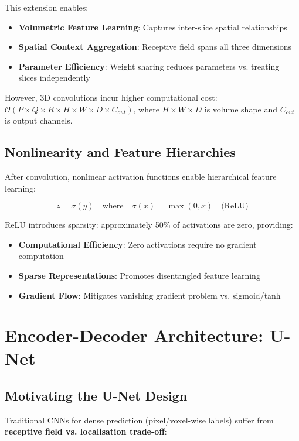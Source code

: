 \documentclass{ecsproject}     %
\begin{document}
This extension enables:
\begin{itemize}
    \item \textbf{Volumetric Feature Learning}: Captures inter-slice spatial relationships
    \item \textbf{Spatial Context Aggregation}: Receptive field spans all three dimensions
    \item \textbf{Parameter Efficiency}: Weight sharing reduces parameters vs. treating slices independently
\end{itemize}

However, 3D convolutions incur higher computational cost: $\mathcal{O}(P \times Q \times R \times H \times W \times D \times C_{out})$, where $H \times W \times D$ is volume shape and $C_{out}$ is output channels.

\subsection{Nonlinearity and Feature Hierarchies}

After convolution, nonlinear activation functions enable hierarchical feature learning:

\begin{equation}
z = \sigma(y) \quad \text{where} \quad \sigma(x) = \max(0, x) \quad \text{(ReLU)}
\label{Eq:ReLU}
\end{equation}

ReLU introduces sparsity: approximately 50\% of activations are zero, providing:
\begin{itemize}
    \item \textbf{Computational Efficiency}: Zero activations require no gradient computation
    \item \textbf{Sparse Representations}: Promotes disentangled feature learning
    \item \textbf{Gradient Flow}: Mitigates vanishing gradient problem vs. sigmoid/tanh
\end{itemize}

\section{Encoder-Decoder Architecture: U-Net}

\subsection{Motivating the U-Net Design}

Traditional CNNs for dense prediction (pixel/voxel-wise labels) suffer from \textbf{receptive field vs. localisation trade-off}:
\end{document}
